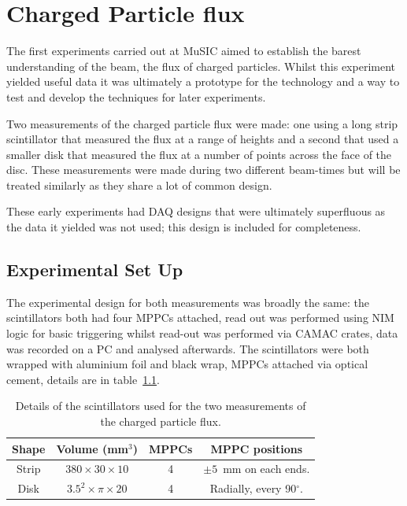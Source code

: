 \chapter{Charged Particle flux} %
\label{cha:charged_particle_flux}
The first experiments carried out at MuSIC aimed to establish the barest understanding of the beam, the flux of charged particles. Whilst this experiment yielded useful data it was ultimately a prototype for the technology and a way to test and develop the techniques for later experiments.

Two measurements of the charged particle flux were made: one using a long strip scintillator that measured the flux at a range of heights and a second that used a smaller disk that measured the flux at a number of points across the face of the disc. These measurements were made during two different beam-times but will be treated similarly as they share a lot of common design.

These early experiments had DAQ designs that were ultimately superfluous as the data it yielded was not used; this design is included for completeness.
\section{Experimental Set Up} %
\label{sec:experimental_set_up}
The experimental design for both measurements was broadly the same: the scintillators both had four MPPCs attached, read out was performed using NIM logic for basic triggering whilst read-out was performed via CAMAC crates, data was recorded on a PC and analysed afterwards. The scintillators were both wrapped with aluminium foil and black wrap, MPPCs attached via optical cement, details are in table~\ref{tab:charged_particle_flux_scint_details}.
\begin{table}
    \begin{center}
    \begin{tabular}{c|c|c|c}
        Shape  &  Volume (mm\(^3\))            &  MPPCs  &  MPPC positions                    \\
        \hline
        Strip  &  \(380 \times30\times10\)     &  4      &  \( \pm 5 \)~mm on each ends.      \\
        Disk   &  \( 3.5^2\times\pi\times20\)  &  4      &  Radially, every 90\( ^{\circ} \). \\
        
    \end{tabular}
    \end{center}
    \caption{Details of the scintillators used for the two measurements of the charged particle flux.}
    \label{tab:charged_particle_flux_scint_details}
\end{table}

